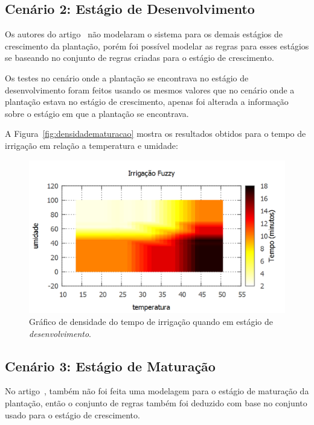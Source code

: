 \documentclass[
	article,			%
	11pt,				%
	oneside,			%
	a4paper,			%
	english,			%
	brazil,				%
	sumario=tradicional
	]{abntex2}
\begin{document}
\begin{multicols}{2}
\subsection{Cenário 2: Estágio de Desenvolvimento}
Os autores do artigo~\cite{ceballos2015fuzzy} não modelaram o sistema para os demais estágios de crescimento da plantação, porém foi possível modelar as regras para esses estágios se baseando no conjunto de regras criadas para o estágio de crescimento.

Os testes no cenário onde a plantação se encontrava no estágio de desenvolvimento foram feitos usando os mesmos valores que no cenário onde a plantação estava no estágio de crescimento, apenas foi alterada a informação sobre o estágio em que a plantação se encontrava.

A Figura~\ref{fig:densidadematuracao} mostra os resultados obtidos para o tempo de irrigação em relação a temperatura e umidade:

\begin{figure}[H]
  \centering
  \includegraphics[width=1\linewidth]{densidade_desenvolvimento}
  \caption{Gráfico de densidade do tempo de irrigação quando em estágio de \textit{desenvolvimento}.}
  \label{fig:densidadedesenvolvimento}
\end{figure}

\columnbreak

\subsection{Cenário 3: Estágio de Maturação}

No artigo~\cite{ceballos2015fuzzy}, também não foi feita uma modelagem para o estágio de maturação da plantação, então o conjunto de regras também foi deduzido com base no conjunto usado para o estágio de crescimento.


\end{multicols}
\end{document}
